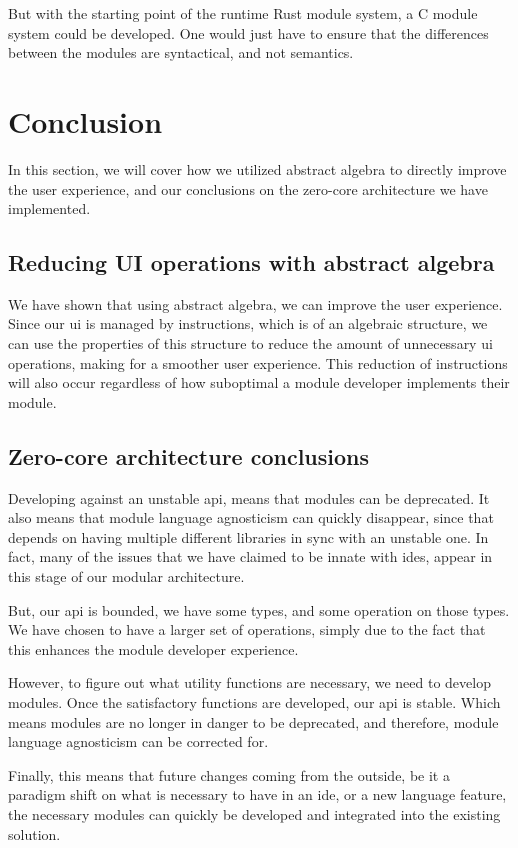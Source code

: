 But with the starting point of the runtime Rust module system, a C module system
could be developed. One would just have to ensure that the differences between
the modules are syntactical, and not semantics.


\section{Conclusion} \label{sec:conclusion}

In this section, we will cover how we utilized abstract algebra to directly
improve the user experience, and our conclusions on the zero-core
architecture we have implemented.


\subsection{Reducing UI operations with abstract algebra}

We have shown that using abstract algebra, we can improve the user experience.
Since our \gls*{ui} is managed by instructions, which is of an algebraic
structure, we can use the properties of this structure to reduce the amount of
unnecessary \gls*{ui} operations, making for a smoother user experience. This
reduction of instructions will also occur regardless of how suboptimal a module
developer implements their module.


\subsection{Zero-core architecture conclusions}

Developing against an unstable \gls*{api}, means that modules can be
deprecated. It also means that module language agnosticism can quickly
disappear, since that depends on having multiple different libraries in sync
with an unstable one. In fact, many of the issues that we have claimed to be
innate with \gls*{ide}s, appear in this stage of our modular architecture.

But, our \gls*{api} is bounded, we have some types, and some operation on those
types. We have chosen to have a larger set of operations, simply due to the
fact that this enhances the module developer experience.

However, to figure out what utility functions are necessary, we need to develop
modules. Once the satisfactory functions are developed, our \gls*{api} is
stable. Which means modules are no longer in danger to be deprecated, and
therefore, module language agnosticism can be corrected for.

Finally, this means that future changes coming from the outside, be it a
paradigm shift on what is necessary to have in an \gls*{ide}, or a new language
feature, the necessary modules can quickly be developed and integrated into the
existing solution.

